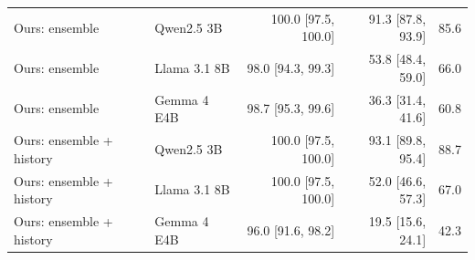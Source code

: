 \begin{tabular}{@{}llrrr@{}}
Ours: ensemble & Qwen2.5 3B & 100.0 {\scriptsize[97.5, 100.0]} & 91.3 {\scriptsize[87.8, 93.9]} & 85.6 \\
Ours: ensemble & Llama 3.1 8B & 98.0 {\scriptsize[94.3, 99.3]} & 53.8 {\scriptsize[48.4, 59.0]} & 66.0 \\
Ours: ensemble & Gemma 4 E4B & 98.7 {\scriptsize[95.3, 99.6]} & 36.3 {\scriptsize[31.4, 41.6]} & 60.8 \\
Ours: ensemble + history & Qwen2.5 3B & 100.0 {\scriptsize[97.5, 100.0]} & 93.1 {\scriptsize[89.8, 95.4]} & 88.7 \\
Ours: ensemble + history & Llama 3.1 8B & 100.0 {\scriptsize[97.5, 100.0]} & 52.0 {\scriptsize[46.6, 57.3]} & 67.0 \\
Ours: ensemble + history & Gemma 4 E4B & 96.0 {\scriptsize[91.6, 98.2]} & 19.5 {\scriptsize[15.6, 24.1]} & 42.3 \\
\bottomrule
\end{tabular}
